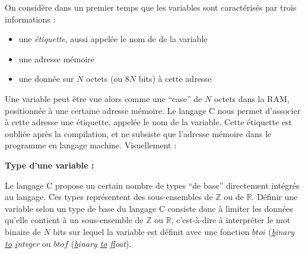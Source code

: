 \documentclass[../../../main.tex]{subfiles}
\begin{document}
On considère dans un premier temps que les variables sont caractérisés par trois informations :
\begin{itemize}
	\item une \textit{étiquette}, aussi appelée le nom de de la variable
	\item une adresse mémoire
	\item une donnée sur $N$ octets (ou $8N$ bits) à cette adresse
\end{itemize}
Une variable peut être vue alors comme une ``case'' de $N$ octets dans la RAM, positionnée à une certaine adresse mémoire. Le langage C nous permet d'associer à cette adresse une étiquette, appelée le nom de la variable. Cette étiquette est oubliée après la compilation, et ne subsiste que l'adresse mémoire dans le programme en langage machine.\newline
Visuellement : 

\begin{minipage}{\textwidth}
	\begin{center}
		
		\label{img:variable}
	\end{center}
\end{minipage}
 
\textbf{Type d'une variable :}
 
Le langage C propose un certain nombre de types ``de base'' directement intégrés au langage. Ces types représentent des sous-ensembles de $\mathbb{Z}$ ou de $\mathbb{R}$. Définir une variable selon un type de base du langage C consiste donc à limiter les données qu'elle contient à un sous-ensemble de $\mathbb{Z}$ ou $\mathbb{R}$, c'est-à-dire à interpréter le mot binaire de $N$ bits sur lequel la variable est définit avec une fonction $btoi$ (\textit{\underline{b}inary \underline{to} \underline{i}nteger} ou $btof$ (\textit{\underline{b}inary \underline{to} \underline{f}loat}).
 
\end{document}
